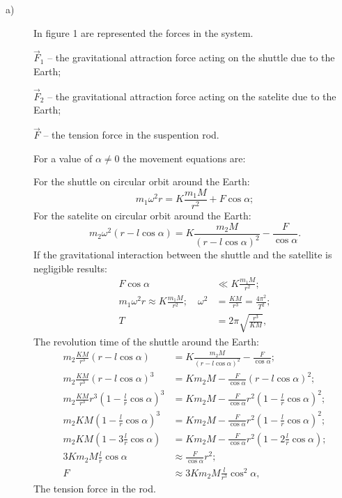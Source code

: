 \begin{description}
\item[a)] In figure 1 are represented the forces in the system.

  $\vec F_1$ -- the gravitational attraction force acting on the shuttle due
  to the Earth;

  $\vec F_2$ -- the gravitational attraction force acting on the satelite due %
  to the Earth;

  $\vec F$ -- the tension force in the suspention rod. %


  For a value of $\alpha \neq 0$ the movement equations are:

  For the shuttle on circular orbit around the Earth:
  \[
    m_1\omega^2r = K\frac{m_1M}{r^2} + F\cos\alpha;
  \]
  For the satelite on circular orbit around the Earth:
  \[
    m_2\omega^2\left(r - l\cos\alpha\right)
      = K\frac{m_2M}{\left(r - l\cos\alpha\right)^2} - \frac{F}{\cos\alpha}.
  \]
  If the gravitational interaction between the shuttle and the satellite is
  negligible results: %
  \begin{align*}
    F\cos\alpha &\ll K\frac{m_1M}{r^2}; \\
    m_1\omega^2r \approx K\frac{m_1M}{r^2};\quad
      \omega^2 &= \frac{KM}{r^3} = \frac{4\pi^2}{T^2}; \\
    T &= 2\pi\sqrt{\frac{r^3}{KM}},
  \end{align*}
  The revolution time of the shuttle around the Earth:
  \begin{align*}
    m_2\frac{KM}{r^3}\left(r - l\cos\alpha\right)
      &= K\frac{m_2M}{\left(r - l\cos\alpha\right)^2}
       - \frac{F}{\cos\alpha}; \\
    m_2\frac{KM}{r^3}\left(r - l\cos\alpha\right)^3
      &= Km_2M - \frac{F}{\cos\alpha}\left(r - l\cos\alpha\right)^2; \\
    m_2\frac{KM}{r^3}r^3\left(1 - \frac{l}{r}\cos\alpha\right)^3
      &= Km_2M - \frac{F}{\cos\alpha}r^2
        \left(1 - \frac{l}{r}\cos\alpha\right)^2; \\
    m_2KM\left(1 - \frac{l}{r}\cos\alpha\right)^3
      &= Km_2M - \frac{F}{\cos\alpha}r^2
        \left(1 - \frac{l}{r}\cos\alpha\right)^2; \\
    m_2KM\left(1 - 3\frac{l}{r}\cos\alpha\right)
      &= Km_2M - \frac{F}{\cos\alpha}r^2
        \left(1 - 2\frac{l}{r}\cos\alpha\right); \\
    3Km_2M\frac{l}{r}\cos\alpha &\approx \frac{F}{\cos\alpha}r^2; \\
    F &\approx 3Km_2M\frac{l}{r^3}\cos^2\alpha,
  \end{align*}
  The tension force in the rod.


\end{description}
